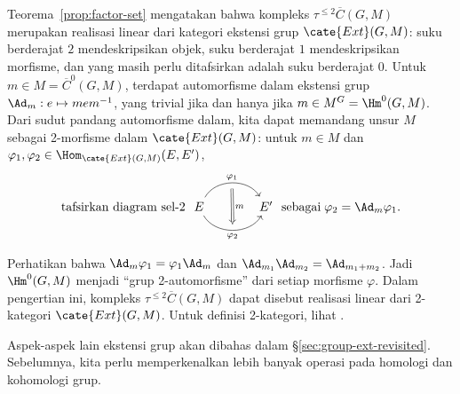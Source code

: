 \begin{remark}\label{rem:Ext-incarnation}
	Teorema~\ref{prop:factor-set} mengatakan bahwa kompleks
	$\tau^{\leq2}\overline{C}(G,M)$ merupakan realisasi linear dari kategori
	ekstensi grup $\cate{Ext}(G,M)$: suku berderajat $2$ mendeskripsikan objek,
	suku berderajat $1$ mendeskripsikan morfisme, dan yang masih perlu
	ditafsirkan adalah suku berderajat $0$. Untuk
	$m\in M=\overline{C}^0(G,M)$, terdapat automorfisme dalam ekstensi grup
	$\Ad_m:e\mapsto mem^{-1}$, yang trivial jika dan hanya jika
	$m\in M^G=\Hm^0(G,M)$. Dari sudut pandang automorfisme dalam, kita dapat
	memandang unsur $M$ sebagai 2-morfisme dalam $\cate{Ext}(G,M)$: untuk
	$m\in M$ dan
	$\varphi_1,\varphi_2\in\Hom_{\cate{Ext}(G,M)}(E,E')$,
	\[ \text{tafsirkan diagram sel-2}\;
	\begin{tikzcd}[column sep=large]
		E \arrow[bend left=60,r,"\varphi_1",""' {name=U}]
		\arrow[bend right=60,r,"\varphi_2"',"" {name=D}] &
		E' \arrow[Rightarrow,from=U,to=D,"m"]
	\end{tikzcd}
	\;\text{sebagai}\;\varphi_2=\Ad_m\varphi_1. \]

	Perhatikan bahwa $\Ad_m\varphi_1=\varphi_1\Ad_m$ dan
	$\Ad_{m_1}\Ad_{m_2}=\Ad_{m_1+m_2}$. Jadi $\Hm^0(G,M)$ menjadi
	``grup 2-automorfisme'' dari setiap morfisme $\varphi$. Dalam pengertian
	ini, kompleks $\tau^{\leq2}\overline{C}(G,M)$ dapat disebut realisasi
	linear dari 2-kategori $\cate{Ext}(G,M)$. Untuk definisi 2-kategori, lihat
	\cite[\S 3.5]{Li1}.
\end{remark}

Aspek-aspek lain ekstensi grup akan dibahas dalam
\S\ref{sec:group-ext-revisited}. Sebelumnya, kita perlu memperkenalkan lebih
banyak operasi pada homologi dan kohomologi grup.
